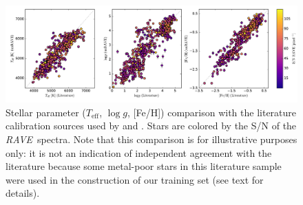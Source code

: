 \documentclass[preprint,trackchanges]{aastex}
\newcommand{\acronym}[1]{{\small{#1}}}
\newcommand{\project}[1]{\textsl{#1}}
\newcommand{\rave}{\project{\acronym{RAVE}}}
\newcommand{\teff}{T_{\mathrm{eff}}}
\newcommand{\logg}{\log g}
\begin{document}
\begin{figure}[p]
\includegraphics[width=\textwidth]{figures/kordopatis-calibration.pdf}
\caption{Stellar parameter ($\teff$, $\logg$, [Fe/H]) comparison with the literature calibration sources used by \citet{Kordopatis_2013} and \citet{Kunder_2016}. Stars are colored by the S/N of the \rave\ spectra. Note that this comparison is for illustrative purposes only: it is not an indication of independent agreement with the literature because some metal-poor stars in this literature sample were used in the construction of our training set (see text for details).\label{fig:kordopatis-calibration}}
\end{figure}
\end{document}
